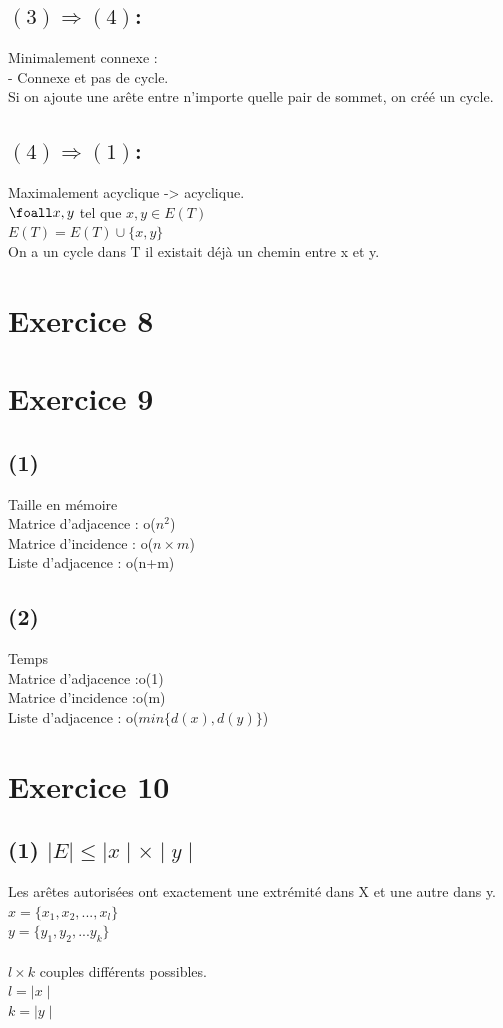 \documentclass{article}
\begin{document}
{\subsection*{$(3) \Rightarrow (4)$:}
Minimalement connexe : \\
- Connexe et pas de cycle. \\
Si on ajoute une arête entre n'importe quelle pair de sommet, on créé un cycle. \\  
\subsection*{$(4) \Rightarrow (1)$:}
Maximalement acyclique -> acyclique. \\
$\foall x,y$ tel que $x,y \in E(T)$ \\
$E(T)=E(T) \cup \{x,y\}$ \\
On a un cycle dans T il existait déjà un chemin entre x et y.
\newpage
\section*{Exercice 8}
\section*{Exercice 9}
\subsection*{(1)}
Taille en mémoire \\
Matrice d'adjacence : o($n^2$) \\
Matrice d'incidence : o($n \times m$)\\
Liste d'adjacence : o(n+m)\\
\subsection*{(2)}
Temps \\
Matrice d'adjacence :o(1) \\
Matrice d'incidence :o(m) \\
Liste d'adjacence : o($min\{d(x),d(y)\}$)\\
\section*{Exercice 10}
\subsection*{(1) $ \mid E \mid \leq \mid x \mid \times \mid y \mid$}
Les arêtes autorisées ont exactement une extrémité dans X et une autre dans y. \\
$x=\{x_1,x_2,...,x_l\}$ \\
$y=\{y_1,y_2,...y_k\}$ \\
\\
$ l \times k$ couples différents possibles. \\
$l=\mid x \mid$ \\
$k=\mid y \mid$ \\
}
\end{document}

